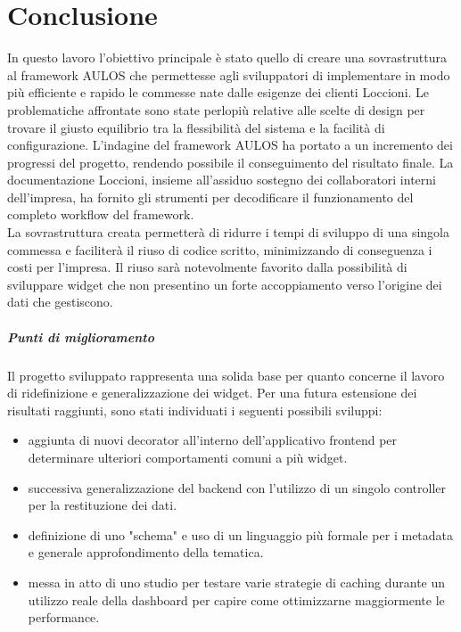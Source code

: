 \chapter{Conclusione}
\label{chap:conclusione}
In questo lavoro l'obiettivo principale è stato quello di creare una sovrastruttura al framework AULOS che permettesse agli sviluppatori di implementare in modo più efficiente e rapido le commesse nate dalle esigenze dei clienti Loccioni. Le problematiche affrontate sono state perlopiù relative alle scelte di design per trovare il giusto equilibrio tra la flessibilità del sistema e la facilità di configurazione. 
L'indagine del framework AULOS ha portato a un incremento dei progressi del progetto, rendendo possibile il conseguimento del risultato finale. La documentazione Loccioni, insieme all'assiduo sostegno dei collaboratori interni dell'impresa, ha fornito gli strumenti per decodificare il funzionamento del completo workflow del framework.
\\
La sovrastruttura creata permetterà di ridurre i tempi di sviluppo di una singola commessa e faciliterà il riuso di codice
scritto, minimizzando di conseguenza i costi per l'impresa. 
Il riuso sarà notevolmente favorito dalla possibilità di sviluppare widget che non presentino un forte accoppiamento verso l'origine dei dati che gestiscono.
\paragraph{Punti di miglioramento}
Il progetto sviluppato rappresenta una solida base per quanto concerne il lavoro di ridefinizione e generalizzazione dei widget. Per una futura estensione dei risultati raggiunti, sono stati individuati i seguenti possibili sviluppi:
\begin{itemize}
    \item aggiunta di nuovi decorator all'interno dell'applicativo frontend per determinare ulteriori comportamenti comuni a più widget.
    \item successiva generalizzazione del backend con l'utilizzo di un singolo controller per la restituzione dei dati.
    \item definizione di uno "schema" e uso di un linguaggio più formale per i metadata e generale approfondimento della tematica.
    \item messa in atto di uno studio per testare varie strategie di caching durante un utilizzo reale della dashboard per capire come ottimizzarne maggiormente le performance.
\end{itemize}
